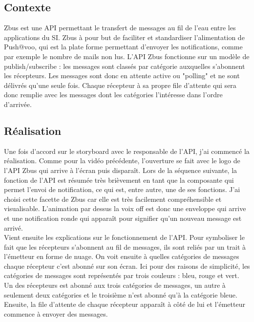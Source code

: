 \subsection{Contexte}
Zbus est une API permettant le transfert de messages au fil de l'eau entre les applications du SI. Zbus à pour but de faciliter et standardiser l'alimentation de Push@voo, qui est la plate forme permettant d'envoyer les notifications,  comme par exemple le nombre de mails non lus. L'API Zbus fonctionne sur un modèle de publish/subscribe : les messages sont classés par catégorie auxquelles s'abonnent les récepteurs. Les messages sont donc en attente active ou "polling" et ne sont délivrés qu'une seule fois. Chaque récepteur à sa propre file d'attente qui sera donc remplie avec les messages dont les catégories l'intéresse dans l'ordre d'arrivée.  


\subsection{Réalisation}

Une fois d'accord sur le storyboard avec le responsable de l'API, j'ai commencé la réalisation. Comme pour la vidéo précédente, l'ouverture se fait avec le logo de l'API Zbus qui arrive à l'écran puis disparaît. Lors de la séquence suivante, la fonction de l'API est résumée très brièvement en tant que la composante qui permet l'envoi de notification, ce qui est, entre autre, une de ses fonctions. J'ai choisi cette facette de Zbus car elle est très facilement compréhensible et visualisable. L'animation par dessus la voix off est donc une enveloppe qui arrive et une notification ronde qui apparaît pour signifier qu'un nouveau message est arrivé.\\

Vient ensuite les explications sur le fonctionnement de l'API. Pour symboliser le fait que les récepteurs s'abonnent au fil de messages, ils sont reliés par un trait à l'émetteur en forme de nuage. On voit ensuite à quelles catégories de messages chaque récepteur c'est abonné sur son écran. Ici pour des raisons de simplicité, les catégories de messages sont représentés par trois couleurs : bleu, rouge et vert. Un des récepteurs est abonné aux trois catégories de messages, un autre à seulement deux catégories et le troisième n'est abonné qu'à la catégorie bleue. Ensuite, la file d'attente de chaque récepteur apparaît à côté de lui et l'émetteur commence à envoyer des messages. 


